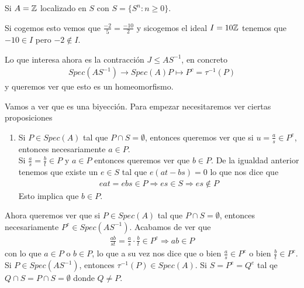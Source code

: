 Si $A = \mathbb{Z}$ localizado en $S$ con $S = \{S^n : n\geq 0\}$.

Si cogemos esto vemos que $\frac{-2}{5} = \frac{-10}{2}$ y sicogemos el ideal $I=10\mathbb{Z}$ tenemos que $-10\in I$ pero $-2\notin I$.

Lo que interesa ahora es la contracción $J\leq AS^{-1}$, en concreto
\begin{gather*}
    Spec(AS^{-1}) \to Spec(A)
    P \mapsto P^c = \tau^{-1}(P)
\end{gather*}
y queremos ver que esto es un homeomorfismo. 


%

Vamos a ver que es una biyección. Para empezar necesitaremos ver ciertas proposiciones
\begin{enumerate}
    \item Si $P\in Spec(A)$ tal que $P\cap S = \emptyset$, entonces queremos ver que si $u = \frac{a}{s}\in P^e$, entonces necesariamente $a\in P$. \\
    
    Si $\frac{a}{s} = \frac{b}{t} \in P$ y $a\in P$ entonces queremos ver que $b\in P$. De la igualdad anterior tenemos que existe un $e\in S$ tal que $e(at - bs) = 0$ lo que nos dice que 
    \begin{gather*}
        eat = ebs \in P \Rightarrow es \in S \Rightarrow es \notin P
    \end{gather*}
    Esto implica que $b\in P$.
\end{enumerate}

Ahora queremos ver que si $P\in Spec(A)$ tal que $P \cap S = \emptyset$, entonces necesariamente $P^e \in Spec(AS^{-1})$. Acabamos de ver que 
\begin{gather*}
    \frac{ab}{st} = \frac{a}{s} \cdot \frac{b}{t} \in P^e \Rightarrow ab \in P
\end{gather*}
con lo que $a\in P$ o $b\in P$, lo que a su vez nos dice que o bien $\frac{a}{s}\in P^e$ o bien $\frac{b}{t}\in P^e$. Si $P\in Spec(AS^{-1})$, entonces $\tau^{-1}(P)\in Spec(A)$. Si $S=P^e=Q^e$ tal qe $Q\cap S = P\cap S = \emptyset$ donde $Q\neq P$.\\

